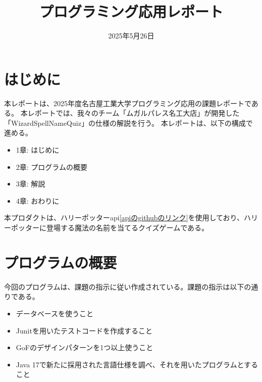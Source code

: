 \documentclass[uplatex,dvipdfmx,a4paper]{jsarticle}
\title{プログラミング応用レポート}
\author{}
\date{2025年5月26日}
\begin{document}
\maketitle

\section{はじめに}
本レポートは、2025年度名古屋工業大学プログラミング応用の課題レポートである。
本レポートでは、我々のチーム「ムガルパレス名工大店」が開発した「WizardSpellNameQuiz」の仕様の解説を行う。
本レポートは、以下の構成で進める。
\begin{itemize}
  \item 1章: はじめに
  \item 2章: プログラムの概要
  \item 3章: 解説
  \item 4章: おわりに
\end{itemize}
本プロダクトは、ハリーポッターapi\href{https://github.com/KostaSav/hp-api}{[apiのgithubのリンク]}を使用しており、ハリーポッターに登場する魔法の名前を当てるクイズゲームである。

\section{プログラムの概要}

今回のプログラムは、課題の指示に従い作成されている。課題の指示は以下の通りである。
\begin{itemize}
  \item データベースを使うこと
  \item Junitを用いたテストコードを作成すること
  \item GoFのデザインパターンを1つ以上使うこと
  \item Java 17で新たに採用された言語仕様を調べ、それを用いたプログラムとすること%
  \end{itemize}
\end{document}
